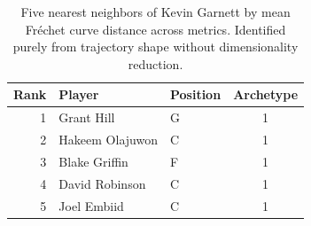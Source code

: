 \begin{table}[htbp]
  \centering\small
  \begin{tabular}{rllc}
    \toprule
    Rank & Player & Position & Archetype \\
    \midrule
    1 & Grant Hill & G & 1 \\
    2 & Hakeem Olajuwon & C & 1 \\
    3 & Blake Griffin & F & 1 \\
    4 & David Robinson & C & 1 \\
    5 & Joel Embiid & C & 1 \\
    \bottomrule
  \end{tabular}
  \caption{Five nearest neighbors of Kevin Garnett by mean Fr\'{e}chet curve distance across metrics. Identified purely from trajectory shape without dimensionality reduction.}
  \label{tab:Kevin_Garnett_frechet_curve_neighbors}
\end{table}

